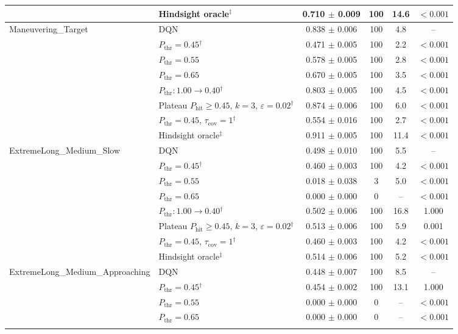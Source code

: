 \begin{table}[htbp]
\begin{tabular}{llcccc}
 & Hindsight oracle$^{\ddagger}$ & 0.710 $\pm$ 0.009 & 100 & 14.6 & $<0.001$ \\
\midrule
\multirow{8}{*}{Maneuvering\_Target} & DQN & 0.838 $\pm$ 0.006 & 100 & 4.8 & -- \\
 & $P_{\mathrm{thr}}=0.45$$^{\dagger}$ & 0.471 $\pm$ 0.005 & 100 & 2.2 & $<0.001$ \\
 & $P_{\mathrm{thr}}=0.55$ & 0.578 $\pm$ 0.005 & 100 & 2.8 & $<0.001$ \\
 & $P_{\mathrm{thr}}=0.65$ & 0.670 $\pm$ 0.005 & 100 & 3.5 & $<0.001$ \\
 & $P_{\mathrm{thr}}: 1.00 \to 0.40$$^{\dagger}$ & 0.803 $\pm$ 0.005 & 100 & 4.5 & $<0.001$ \\
 & Plateau $P_{\mathrm{hit}}\geq0.45$, $k=3$, $\varepsilon=0.02$$^{\dagger}$ & 0.874 $\pm$ 0.006 & 100 & 6.0 & $<0.001$ \\
 & $P_{\mathrm{thr}}=0.45$, $\tau_{\mathrm{cov}}=1$$^{\dagger}$ & 0.554 $\pm$ 0.016 & 100 & 2.7 & $<0.001$ \\
 & Hindsight oracle$^{\ddagger}$ & 0.911 $\pm$ 0.005 & 100 & 11.4 & $<0.001$ \\
\midrule
\multirow{8}{*}{ExtremeLong\_Medium\_Slow} & DQN & 0.498 $\pm$ 0.010 & 100 & 5.5 & -- \\
 & $P_{\mathrm{thr}}=0.45$$^{\dagger}$ & 0.460 $\pm$ 0.003 & 100 & 4.2 & $<0.001$ \\
 & $P_{\mathrm{thr}}=0.55$ & 0.018 $\pm$ 0.038 & 3 & 5.0 & $<0.001$ \\
 & $P_{\mathrm{thr}}=0.65$ & 0.000 $\pm$ 0.000 & 0 & -- & $<0.001$ \\
 & $P_{\mathrm{thr}}: 1.00 \to 0.40$$^{\dagger}$ & 0.502 $\pm$ 0.006 & 100 & 16.8 & 1.000 \\
 & Plateau $P_{\mathrm{hit}}\geq0.45$, $k=3$, $\varepsilon=0.02$$^{\dagger}$ & 0.513 $\pm$ 0.006 & 100 & 5.9 & 0.001 \\
 & $P_{\mathrm{thr}}=0.45$, $\tau_{\mathrm{cov}}=1$$^{\dagger}$ & 0.460 $\pm$ 0.003 & 100 & 4.2 & $<0.001$ \\
 & Hindsight oracle$^{\ddagger}$ & 0.514 $\pm$ 0.006 & 100 & 5.2 & $<0.001$ \\
\midrule
\multirow{8}{*}{ExtremeLong\_Medium\_Approaching} & DQN & 0.448 $\pm$ 0.007 & 100 & 8.5 & -- \\
 & $P_{\mathrm{thr}}=0.45$$^{\dagger}$ & 0.454 $\pm$ 0.002 & 100 & 13.1 & 1.000 \\
 & $P_{\mathrm{thr}}=0.55$ & 0.000 $\pm$ 0.000 & 0 & -- & $<0.001$ \\
 & $P_{\mathrm{thr}}=0.65$ & 0.000 $\pm$ 0.000 & 0 & -- & $<0.001$ \\
$$
\end{tabular}
\end{table}
